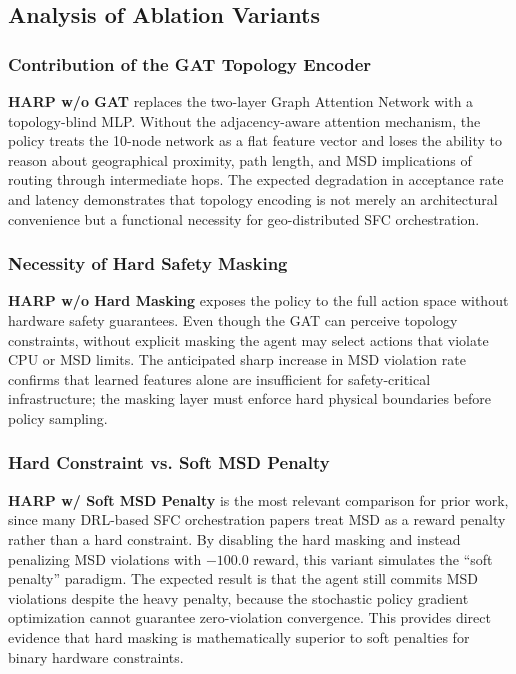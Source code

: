 \documentclass[12pt, a4paper, reqno, oneside]{book}
\begin{document}
\subsection{Analysis of Ablation Variants}

\subsubsection{Contribution of the GAT Topology Encoder}
\textbf{HARP w/o GAT} replaces the two-layer Graph Attention Network with a topology-blind MLP. Without the adjacency-aware attention mechanism, the policy treats the 10-node network as a flat feature vector and loses the ability to reason about geographical proximity, path length, and MSD implications of routing through intermediate hops. The expected degradation in acceptance rate and latency demonstrates that topology encoding is not merely an architectural convenience but a functional necessity for geo-distributed SFC orchestration.

\subsubsection{Necessity of Hard Safety Masking}
\textbf{HARP w/o Hard Masking} exposes the policy to the full action space without hardware safety guarantees. Even though the GAT can perceive topology constraints, without explicit masking the agent may select actions that violate CPU or MSD limits. The anticipated sharp increase in MSD violation rate confirms that learned features alone are insufficient for safety-critical infrastructure; the masking layer must enforce hard physical boundaries before policy sampling.

\subsubsection{Hard Constraint vs. Soft MSD Penalty}
\textbf{HARP w/ Soft MSD Penalty} is the most relevant comparison for prior work, since many DRL-based SFC orchestration papers treat MSD as a reward penalty rather than a hard constraint. By disabling the hard masking and instead penalizing MSD violations with $-100.0$ reward, this variant simulates the ``soft penalty'' paradigm. The expected result is that the agent still commits MSD violations despite the heavy penalty, because the stochastic policy gradient optimization cannot guarantee zero-violation convergence. This provides direct evidence that hard masking is mathematically superior to soft penalties for binary hardware constraints.
\end{document}
